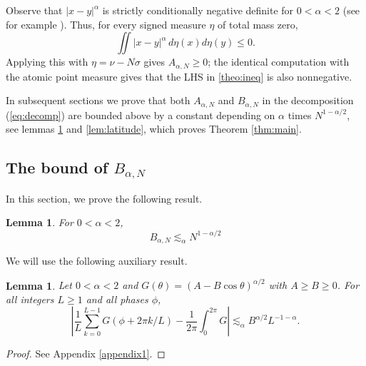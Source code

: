 \documentclass[11pt]{amsart}
\newtheorem{lemma}[theorem]{Lemma}
\begin{document}
\noindent Observe that $|x-y|^\alpha$ is strictly
conditionally negative definite for $0<\alpha<2$ (see for example \cite[Th. 4.4.7]{BHS19}).  Thus, for every signed
measure $\eta$ of total mass zero,
\[
 \iint |x-y|^\alpha\,d\eta(x)d\eta(y)\le0.
\]
Applying this with $\eta=\nu-N\sigma$ gives $A_{\alpha,N}\ge0$; the identical computation
with the atomic point measure gives that the LHS in \eqref{theo:ineq} is also nonnegative.


In subsequent sections we prove that both $A_{\alpha,N}$ and $B_{\alpha,N}$ in
the decomposition
(\ref{eq:decomp}) are bounded above by a constant depending on $\alpha$ times $N^{1-\alpha/2}$, see lemmas \ref{lem:BalphaN} and \ref{lem:latitude}, which proves Theorem \ref{thm:main}.






\subsection{The bound of $B_{\alpha,N}$}


In this section, we prove the following result.
\begin{lemma}\label{lem:BalphaN}
For $0<\alpha<2$,
\begin{equation*}%
    B_{\alpha,N}\lesssim_\alpha N^{1-\alpha/2}
\end{equation*}
\end{lemma}
We will use the following auxiliary result.
\begin{lemma}\label{lem:trap}
Let $0<\alpha<2$ and $G(\theta)=(A-B\cos\theta)^{\alpha/2}$ with $A\ge B\ge0$.  For all
integers $L\ge1$ and all phases $\phi$,
\[
 \left|\frac1L\sum_{k=0}^{L-1}G(\phi+2\pi k/L)
 -\frac1{2\pi}\int_0^{2\pi}G\right|
 \lesssim_\alpha B^{\alpha/2}L^{-1-\alpha}.             %
\]
\end{lemma}



\begin{proof}
See Appendix \ref{appendix1}.
\end{proof}
\end{document}
